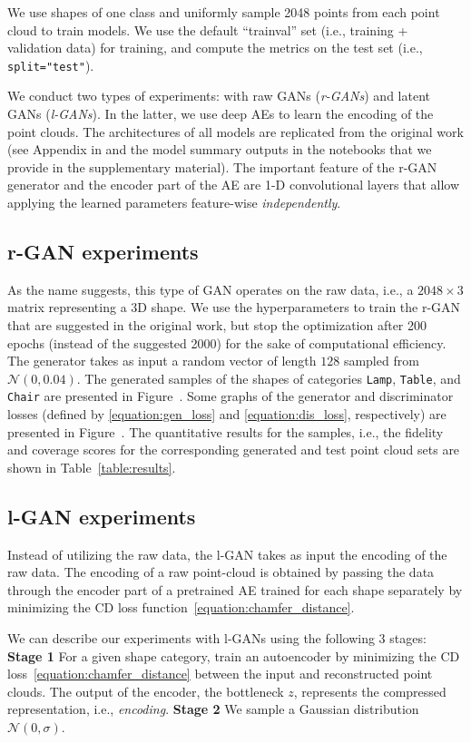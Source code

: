 \documentclass[12pt]{article}
\begin{document}
    We use shapes of one class and uniformly sample 2048 points from each point cloud to train models. We use the default ``trainval'' set (i.e., training + validation data) for training, and compute the metrics on the test set (i.e., \verb|split="test"|).

    We conduct two types of experiments: with raw GANs (\textit{r-GANs}) and latent GANs (\textit{l-GANs}). In the latter, we use deep AEs to learn the encoding of the point clouds. The architectures of all models are replicated from the original work (see Appendix in \cite{pmlr-v80-achlioptas18a} and the model summary outputs in the notebooks that we provide in the supplementary material). The important feature of the r-GAN generator and the encoder part of the AE are 1-D convolutional layers that allow applying the learned parameters feature-wise \textit{independently}.

    \subsection{r-GAN experiments} As the name suggests, this type of GAN operates on the raw data, i.e., a $2048 \times 3$ matrix representing a 3D shape. We use the hyperparameters to train the r-GAN that are suggested in the original work, but stop the optimization after 200 epochs (instead of the suggested 2000) for the sake of computational efficiency. The generator takes as input a random vector of length $128$ sampled from $\mathcal{N}(0,0.04)$.
    The generated samples of the shapes of categories \verb|Lamp|, \verb|Table|, and \verb|Chair| are presented in Figure~. Some graphs of the generator and discriminator losses (defined by \eqref{equation:gen_loss} and \eqref{equation:dis_loss}, respectively) are presented in Figure~.
    The quantitative results for the samples, i.e., the fidelity and coverage scores for the corresponding generated and test point cloud sets are shown in Table~\ref{table:results}.

    \subsection{l-GAN experiments} Instead of utilizing the raw data, the l-GAN takes as input the encoding of the raw data. The encoding of a raw point-cloud is obtained by passing the data through the encoder part of a pretrained AE trained for each shape separately by minimizing the CD loss function~\eqref{equation:chamfer_distance}.

    We can describe our experiments with l-GANs using the following 3 stages:
    \textbf{Stage 1} For a given shape category, train an autoencoder by minimizing the CD loss~\eqref{equation:chamfer_distance} between the input and reconstructed point clouds. The output of the encoder, the bottleneck $z$, represents the compressed representation, i.e., \textit{encoding}.
    \textbf{Stage 2} We sample a Gaussian distribution $\mathcal{N}(0,\sigma)$.
\end{document}

